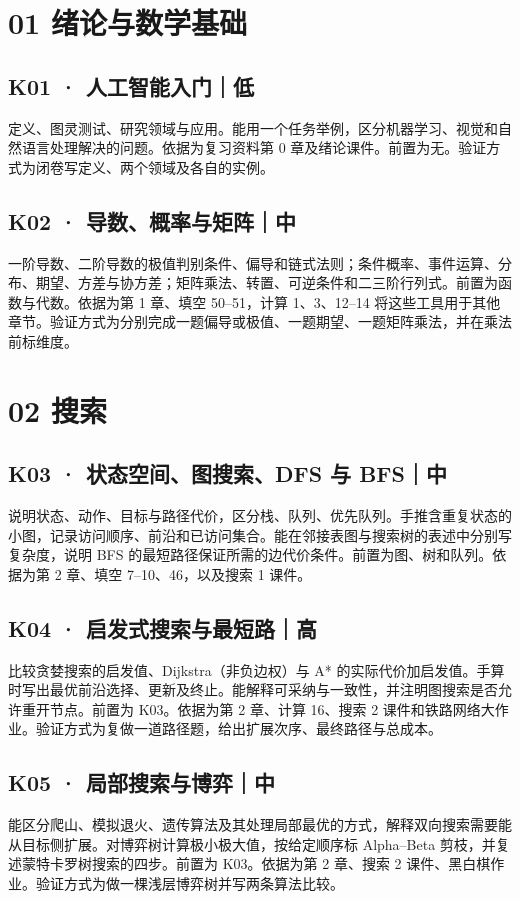 \documentclass[UTF8,a4paper,11pt]{ctexart}
\begin{document}
\section{01 绪论与数学基础}
\subsection{K01 · 人工智能入门｜低}
定义、图灵测试、研究领域与应用。能用一个任务举例，区分机器学习、视觉和自然语言处理解决的问题。依据为复习资料第 0 章及绪论课件。前置为无。验证方式为闭卷写定义、两个领域及各自的实例。

\subsection{K02 · 导数、概率与矩阵｜中}
一阶导数、二阶导数的极值判别条件、偏导和链式法则；条件概率、事件运算、分布、期望、方差与协方差；矩阵乘法、转置、可逆条件和二三阶行列式。前置为函数与代数。依据为第 1 章、填空 50–51，计算 1、3、12–14 将这些工具用于其他章节。验证方式为分别完成一题偏导或极值、一题期望、一题矩阵乘法，并在乘法前标维度。

\section{02 搜索}
\subsection{K03 · 状态空间、图搜索、DFS 与 BFS｜中}
说明状态、动作、目标与路径代价，区分栈、队列、优先队列。手推含重复状态的小图，记录访问顺序、前沿和已访问集合。能在邻接表图与搜索树的表述中分别写复杂度，说明 BFS 的最短路径保证所需的边代价条件。前置为图、树和队列。依据为第 2 章、填空 7–10、46，以及搜索 1 课件。

\subsection{K04 · 启发式搜索与最短路｜高}
比较贪婪搜索的启发值、Dijkstra（非负边权）与 A* 的实际代价加启发值。手算时写出最优前沿选择、更新及终止。能解释可采纳与一致性，并注明图搜索是否允许重开节点。前置为 K03。依据为第 2 章、计算 16、搜索 2 课件和铁路网络大作业。验证方式为复做一道路径题，给出扩展次序、最终路径与总成本。

\subsection{K05 · 局部搜索与博弈｜中}
能区分爬山、模拟退火、遗传算法及其处理局部最优的方式，解释双向搜索需要能从目标侧扩展。对博弈树计算极小极大值，按给定顺序标 Alpha–Beta 剪枝，并复述蒙特卡罗树搜索的四步。前置为 K03。依据为第 2 章、搜索 2 课件、黑白棋作业。验证方式为做一棵浅层博弈树并写两条算法比较。
\end{document}
